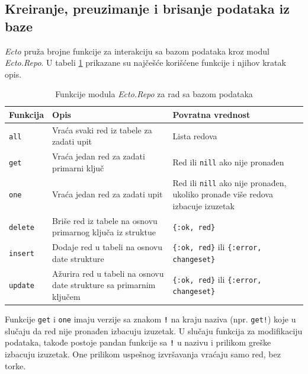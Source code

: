 \documentclass[12pt,oneside]{memoir}
\begin{document}
\subsection{Kreiranje, preuzimanje i brisanje podataka iz baze}
\emph{Ecto} pruža brojne funkcije za interakciju sa bazom podataka kroz modul \emph{Ecto.Repo}.
U tabeli \ref{table:repoFuntions} prikazane su najčešće korišćene funkcije i njihov kratak opis.
\begin{table}[h!]
  \renewcommand*{\arraystretch}{1.4}
  \small
  \centering
  \begin{tabular}{p{} | p{} | p{}}
    Funkcija & Opis & Povratna vrednost\\ [0.5ex] 
    \hline
    \texttt{all} & Vraća svaki red iz tabele za zadati upit & Lista redova \\ 
    \texttt{get} & Vraća jedan red za zadati primarni ključ & Red ili \texttt{nill} ako nije pronađen  \\
    \texttt{one} & Vraća jedan red za zadati upit &  Red ili \texttt{nill} ako nije pronađen, ukoliko pronađe više redova izbacuje izuzetak \\
    \hline
    \texttt{delete} & Briše red iz tabele na osnovu primarnog ključa iz struktue & \texttt{\{:ok, red\}} \\ 
    \texttt{insert} & Dodaje red u tabeli na osnovu date strukture & \texttt{\{:ok, red\}} ili \texttt{\{:error, changeset\}}\\
    \texttt{update} & Ažurira red u tabeli na osnovu date strukture sa primarnim ključem & \texttt{\{:ok, red\}} ili \texttt{\{:error, changeset\}} \\
  \end{tabular}
  \caption{Funkcije modula \emph{Ecto.Repo} za rad sa bazom podataka}
  \label{table:repoFuntions}
  \end{table}

Funkcije \texttt{get} i \texttt{one} imaju verzije sa znakom \texttt{\textbf{!}}
na kraju naziva (npr. \texttt{get!}) koje u slučaju da red nije pronađen izbacuju izuzetak.
U slučaju funkcija za modifikaciju podataka, takođe postoje pandan funkcije sa \texttt{\textbf{!}} u nazivu
i prilikom greške izbacuju izuzetak. One prilikom uspešnog izvršavanja vraćaju samo red, bez torke.
\end{document}
